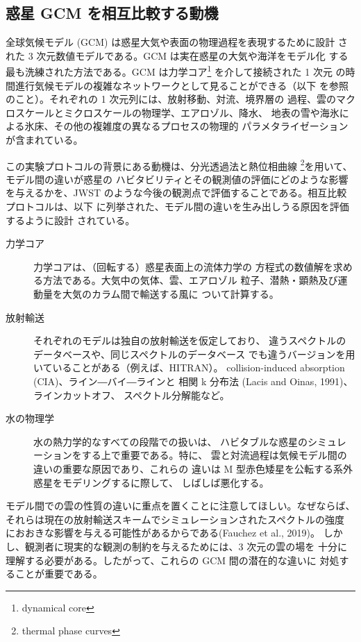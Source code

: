 \documentclass{dennou777}
\begin{document}
\subsection{惑星 GCM を相互比較する動機}

全球気候モデル (GCM) は惑星大気や表面の物理過程を表現するために設計
された 3 次元数値モデルである。GCM は実在惑星の大気や海洋をモデル化
する最も洗練された方法である。GCM は力学コア\footnote{dynamical core}
を介して接続された 1 次元
の時間進行気候モデルの複雑なネットワークとして見ることができる（以下
を参照のこと）。それぞれの 1 次元列には、放射移動、対流、境界層の
過程、雲のマクロスケールとミクロスケールの物理学、エアロゾル、降水、
地表の雪や海氷による氷床、その他の複雑度の異なるプロセスの物理的
パラメタライゼーションが含まれている。

この実験プロトコルの背景にある動機は、分光透過法と熱位相曲線
\footnote{thermal phase curves}を用いて、モデル間の違いが惑星の
ハビタビリティとその観測値の評価にどのような影響を与えるかを、JWST
のような今後の観測点で評価することである。相互比較プロトコルは、以下
に列挙された、モデル間の違いを生み出しうる原因を評価するように設計
されている。

\begin{description}
	\item[力学コア] 力学コアは、（回転する）惑星表面上の流体力学の
		方程式の数値解を求める方法である。大気中の気体、雲、エアロゾル
		粒子、潜熱・顕熱及び運動量を大気のカラム間で輸送する風に
		ついて計算する。
	\item[放射輸送] それぞれのモデルは独自の放射輸送を仮定しており、
		違うスペクトルのデータベースや、同じスペクトルのデータベース
		でも違うバージョンを用いていることがある（例えば、HITRAN）。
		collision-induced absorption (CIA)、ライン―バイ―ラインと
		相関 k 分布法 (Lacis and Oinas, 1991)、ラインカットオフ、
		スペクトル分解能など。
	\item[水の物理学] 水の熱力学的なすべての段階での扱いは、
		ハビタブルな惑星のシミュレーションをする上で重要である。特に、
		雲と対流過程は気候モデル間の違いの重要な原因であり、これらの
		違いは M 型赤色矮星を公転する系外惑星をモデリングするに際して、
		しばしば悪化する。
\end{description}

モデル間での雲の性質の違いに重点を置くことに注意してほしい。なぜならば、
それらは現在の放射輸送スキームでシミュレーションされたスペクトルの強度
におおきな影響を与える可能性があるからである(Fauchez et al., 2019)。
しかし、観測者に現実的な観測の制約を与えるためには、3 次元の雲の場を
十分に理解する必要がある。したがって、これらの GCM 間の潜在的な違いに
対処することが重要である。
\end{document}
